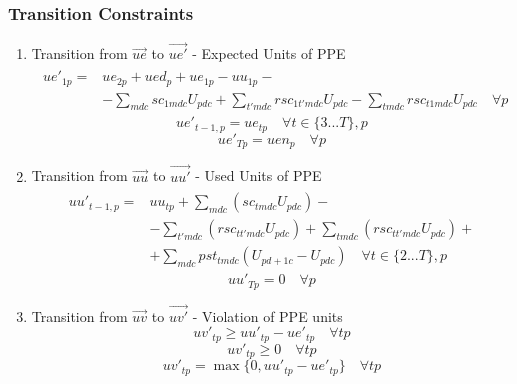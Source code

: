 \documentclass{article}
\begin{document}
\subsubsection{Transition Constraints}

\begin{enumerate}

	\item Transition from $\vec{ue}$ to $\vec{ue'}$ - Expected Units of PPE
		\begin{align} \begin{split}  
			ue'_{1p} = & ue_{2p} + ued_{p} + ue_{1p} - uu_{1p} - \\
				& - \sum_{mdc} sc_{1mdc}U_{pdc} + \sum_{t'mdc} rsc_{1t'mdc}U_{pdc} - \sum_{tmdc} rsc_{t1mdc}U_{pdc} \quad \forall p 
		\end{split} \end{align} 
		\begin{equation}  
			ue'_{t-1,p} = ue_{tp} \quad \forall t \in \{3...T\}, p
		 \end{equation} 
		\begin{equation}  
			ue'_{Tp} = uen_{p} \quad \forall p 
		\end{equation} 
	
	\item Transition from $\vec{uu}$ to $\vec{uu'}$ - Used Units of PPE		
		\begin{align} \begin{split}  
			uu'_{t-1,p} = &  uu	_{tp} + \sum_{mdc} ( sc_{tmdc} U_{pdc} ) - \\ 
								&	- \sum_{t'mdc} (rsc_{tt'mdc} U_{pdc}) + \sum_{tmdc} (rsc_{tt'mdc} U_{pdc}) + \\ 
								& 	+ \sum_{mdc} pst_{tmdc} (U_{pd+1c} - U_{pdc})  \quad \forall t \in \{2...T\}, p  
		\end{split} \end{align}
		\begin{equation}  
			uu'_{Tp} = 0 \quad \forall p 
		\end{equation} 
		
	\item Transition from $\vec{uv}$ to $\vec{uv'}$ - Violation of PPE units
	\begin{equation}
		uv'_{tp} \ge uu'_{tp} - ue'_{tp} \quad \forall tp
	\end{equation}
	\begin{equation}
		uv'_{tp} \ge 0 \quad \forall tp
	\end{equation}
	\begin{equation}
		uv'_{tp} = \max \{0, uu'_{tp} - ue'_{tp} \} \quad \forall tp
	\end{equation}


\end{enumerate}
\end{document}
